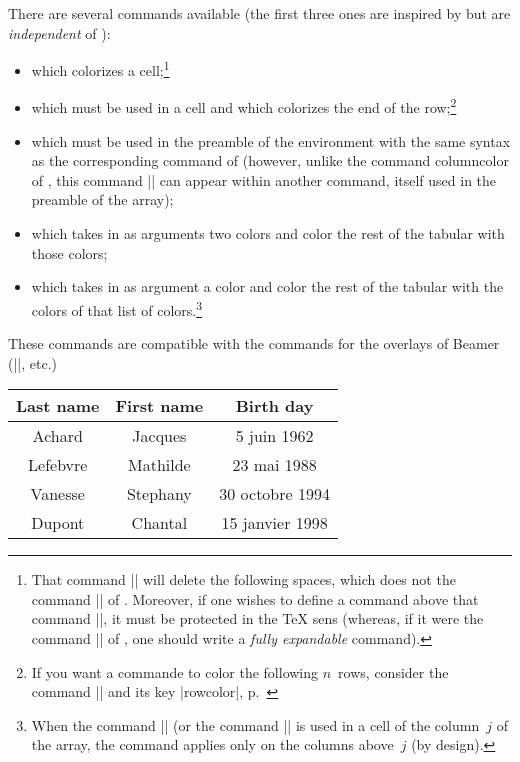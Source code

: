\documentclass[dvipsnames]{article}%
\begin{document}
There are several commands available (the first three ones are inspired by
 but are \emph{independent} of ):
\begin{itemize}
\item {} which colorizes a cell;\footnote{That
  command |\cellcolor| will delete the following spaces, which does not the
  command |\cellcolor| of . Moreover, if one wishes to define a
  command above that command |\cellcolor|, it must be protected in the TeX sens
  (whereas, if it were the command |\cellcolor| of , one should
  write a \emph{fully expandable} command).}
\item {} which must be used in a cell and which
colorizes the end of the row;\footnote{If you want a commande to color the
  following $n$~rows, consider the command |\RowStyle| and its key |rowcolor|,
  p.~\pageref{RowStyle}} 
\item {} which must be used in the preamble of the
environment with the same syntax as the corresponding command of 
(however, unlike the command columncolor of , this command
|\columncolor| can appear within another command, itself used in the preamble of
the array);
\item {} which takes in as arguments two colors and
color the rest of the tabular with those colors;
\item {} which takes in as argument a color and
color the rest of the tabular with the colors of that list of
colors.\footnote{When the command |\rowlistcolors| (or the command |\rowcolors|
  is used in a cell of the column~$j$ of the array, the command applies only on
  the columns above~$j$ (by design).}
\end{itemize}
These commands are compatible with the commands for the overlays of Beamer
(|\only|, etc.) 

\smallskip
\begin{Code}
\NewDocumentCommand { \Blue } { } { \emph{} }
\begin{NiceTabular}{>{\Blue}c>{\Blue}cc} 
\toprule
\emph{}
Last name & First name & Birth day \\
\midrule
Achard  & Jacques & 5 juin 1962 \\
Lefebvre & Mathilde & 23 mai 1988 \\
Vanesse & Stephany & 30 octobre 1994 \\
Dupont & Chantal & 15 janvier 1998 \\
\bottomrule
\end{NiceTabular}
\end{Code}
\end{document}
